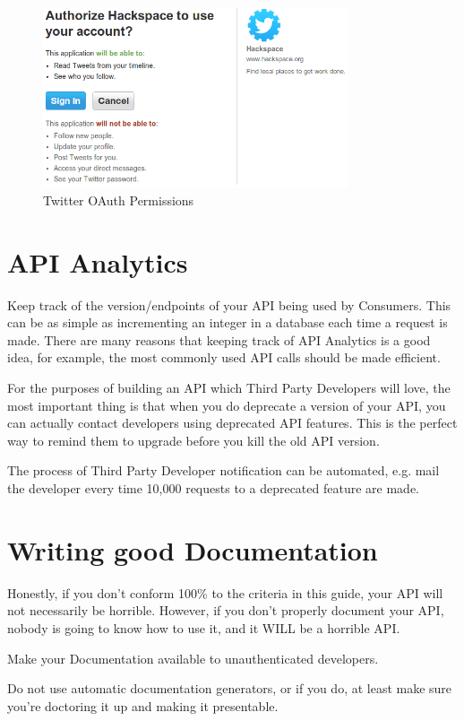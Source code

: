 \documentclass{book}
\begin{document}
\begin{figure}[ht!]
\centering
\includegraphics[width=90mm]{images/permissions-twitter.png}
\caption{Twitter OAuth Permissions}
\label{fig:twitteroauth}
\end{figure}


\section{API Analytics}

Keep track of the version/endpoints of your API being used by Consumers. This can be as simple as incrementing an integer in a database each time a request is made. There are many reasons that keeping track of API Analytics is a good idea, for example, the most commonly used API calls should be made efficient.

For the purposes of building an API which Third Party Developers will love, the most important thing is that when you do deprecate a version of your API, you can actually contact developers using deprecated API features. This is the perfect way to remind them to upgrade before you kill the old API version.

The process of Third Party Developer notification can be automated, e.g. mail the developer every time 10,000 requests to a deprecated feature are made.


\section{Writing good Documentation}

Honestly, if you don't conform 100\% to the criteria in this guide, your API will not necessarily be horrible. However, if you don't properly document your API, nobody is going to know how to use it, and it WILL be a horrible API.

Make your Documentation available to unauthenticated developers.

Do not use automatic documentation generators, or if you do, at least make sure you're doctoring it up and making it presentable.
\end{document}
